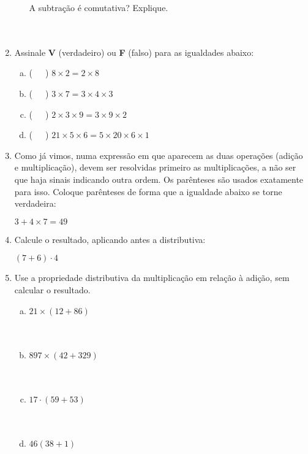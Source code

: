 \documentclass[a4paper,14pt]{article}
\begin{document}
\begin{multicols}{2}
\begin{enumerate}
\begin{enumerate}[a)]
    			A subtração é comutativa? Explique. \\\\\\
    		\end{enumerate}
    		\item Assinale \textbf{V} (verdadeiro) ou \textbf{F} (falso) para as igualdades abaixo:
    		\begin{enumerate}[a)]
    			\item (~~~) $8 \times 2 = 2 \times 8$
    			\item (~~~) $3 \times 7 = 3 \times 4 \times 3$
    			\item (~~~) $2 \times 3 \times 9 = 3 \times 9 \times 2$
    			\item (~~~) $21 \times 5 \times 6 = 5 \times 20 \times 6 \times 1$
    		\end{enumerate}
    		\item Como já vimos, numa expressão em que aparecem as duas operações (adição e multiplicação), devem ser resolvidas primeiro as multiplicações, a não ser que haja sinais indicando outra ordem. Os parênteses são usados exatamente para isso. Coloque parênteses de forma que a igualdade abaixo se torne verdadeira:
    		\begin{center}$3 + 4 \times 7 = 49$ \end{center}
    		\item Calcule o resultado, aplicando antes a distributiva:
    		\begin{center}$(7 + 6) \cdot 4$ \vspace{6cm}\end{center} 
    		\item Use a propriedade distributiva da multiplicação em relação à adição, sem calcular o resultado.
    		\begin{enumerate}[a)]
    			\item $21 \times (12 + 86)$ \\\\\\
    			\item $897 \times (42 + 329)$ \\\\\\
    			\item $17 \cdot (59 + 53)$ \\\\\\
    			\item $46(38 + 1)$ \\\\\\

\end{enumerate}
\end{enumerate}
\end{multicols}
\end{document}
